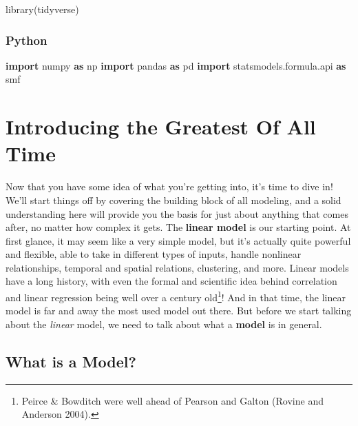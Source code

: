 \documentclass[
  letterpaper,
]{krantz}
\newenvironment{Shaded}{}{}
\newcommand{\FunctionTok}[1]{\textcolor[rgb]{0.02,0.16,0.49}{#1}}
\newcommand{\ImportTok}[1]{\textcolor[rgb]{0.00,0.50,0.00}{\textbf{#1}}}
\newcommand{\NormalTok}[1]{#1}
\begin{document}
\begin{Shaded}
\begin{Highlighting}[]
\FunctionTok{library}\NormalTok{(tidyverse)}
\end{Highlighting}
\end{Shaded}

\subsubsection{Python}

\begin{Shaded}
\begin{Highlighting}[]
\ImportTok{import}\NormalTok{ numpy }\ImportTok{as}\NormalTok{ np}
\ImportTok{import}\NormalTok{ pandas }\ImportTok{as}\NormalTok{ pd}
\ImportTok{import}\NormalTok{ statsmodels.formula.api }\ImportTok{as}\NormalTok{ smf}
\end{Highlighting}
\end{Shaded}

\section{Introducing the Greatest Of All
Time}\label{introducing-the-greatest-of-all-time}

Now that you have some idea of what you're getting into, it's time to
dive in! We'll start things off by covering the building block of all
modeling, and a solid understanding here will provide you the basis for
just about anything that comes after, no matter how complex it gets. The
\textbf{linear model} is our starting point. At first glance, it may
seem like a very simple model, but it's actually quite powerful and
flexible, able to take in different types of inputs, handle nonlinear
relationships, temporal and spatial relations, clustering, and more.
Linear models have a long history, with even the formal and scientific
idea behind correlation and linear regression being well over a century
old\footnote{Peirce \& Bowditch were well ahead of Pearson and Galton
  (Rovine and Anderson 2004).}! And in that time, the linear model is
far and away the most used model out there. But before we start talking
about the \emph{linear} model, we need to talk about what a
\textbf{model} is in general.

\subsection{What is a Model?}\label{what-is-a-model}
\end{document}
